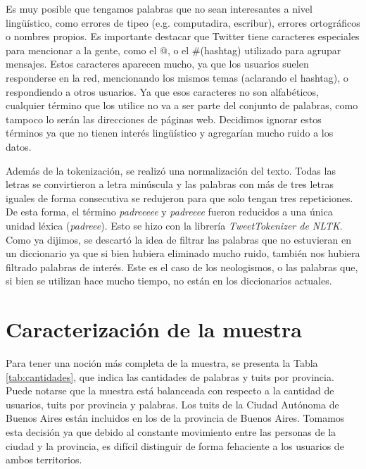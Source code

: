 Es muy posible que tengamos palabras que no sean interesantes a nivel lingüístico, como errores de tipeo (e.g. computadira, escribur), errores ortográficos o  nombres propios. Es importante destacar que Twitter tiene caracteres especiales para mencionar a la gente, como el @, o el \#(hashtag) utilizado para agrupar mensajes. Estos caracteres aparecen mucho, ya que los usuarios suelen responderse en la red, mencionando los mismos temas (aclarando el hashtag), o respondiendo a otros usuarios. Ya que esos caracteres no son alfabéticos, cualquier término que los utilice no va a ser parte del conjunto de palabras, como tampoco lo serán las direcciones de páginas web. Decidimos ignorar estos términos ya que no tienen interés lingüístico y agregarían mucho ruido a los datos.

Además de la tokenización, se realizó una normalización del texto. Todas las letras se convirtieron a letra minúscula y las palabras con más de tres letras iguales de forma consecutiva se redujeron para que solo tengan tres repeticiones. De esta forma, el término \textit{padreeeee} y \textit{padreeee} fueron reducidos a una única unidad léxica (\textit{padreee}). Esto se hizo con la librería \textit{TweetTokenizer de NLTK}. 
Como ya dijimos, se descartó la idea de filtrar las palabras que no estuvieran en un diccionario ya que si bien hubiera eliminado mucho ruido, también nos hubiera filtrado palabras de interés. Este es el caso de los neologismos, o las palabras que, si bien se utilizan hace mucho tiempo, no están en los diccionarios actuales.

\section{Caracterización de la muestra}

Para tener una noción más completa de la muestra, se presenta la Tabla \ref{tab:cantidades}, que indica las cantidades de palabras y tuits por provincia. Puede notarse que la muestra está balanceada con respecto a la cantidad de usuarios, tuits por provincia y palabras. Los tuits de la Ciudad Autónoma de Buenos Aires están incluidos en los de la provincia de Buenos Aires. Tomamos esta decisión ya que debido al constante movimiento entre las personas de la ciudad y la provincia, es difícil distinguir de forma fehaciente a los usuarios de ambos territorios.


